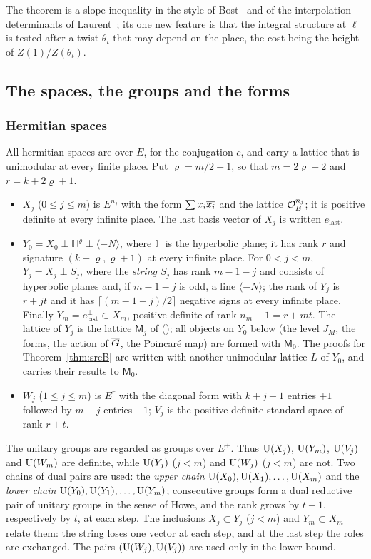 \documentclass[10pt]{amsart}
\theoremstyle{definition}
\theoremstyle{remark}
\begin{document}
The theorem is a slope inequality in the style of Bost~\cite{BostFoliations} and of the
interpolation determinants of Laurent~\cite{LaurentInterp}; its one new feature is that the
integral structure at $\ell$ is tested after a twist $\theta_\iota$ that may depend on the place,
the cost being the height of $Z(1)/Z(\theta_\iota)$.


\subsection{The spaces, the groups and the forms}\label{ss:au-spaces}

\subsubsection*{Hermitian spaces}
All hermitian spaces are over $E$, for the conjugation $c$, and carry a lattice that is unimodular
at every finite place. Put $\varrho=m/2-1$, so that $m=2\varrho+2$ and $r=k+2\varrho+1$.
\begin{itemize}
\item $X_j$ ($0\le j\le m$) is $E^{n_j}$ with the form $\sum x_i\overline{x_i}$ and the lattice
$\mathcal O_E^{n_j}$; it is positive definite at every infinite place. The last basis vector of $X_j$ is
written $e_{\mathrm{last}}$.
\item $Y_0=X_0\perp\mathbb H^{\varrho}\perp\langle-N\rangle$, where $\mathbb H$ is the hyperbolic
plane; it has rank $r$ and signature $(k+\varrho,\varrho+1)$ at every infinite place. For
$0<j<m$, $Y_j=X_j\perp S_j$, where the \emph{string} $S_j$ has rank $m-1-j$ and consists of
hyperbolic planes and, if $m-1-j$ is odd, a line $\langle-N\rangle$; the rank of $Y_j$ is
$r+jt$ and it has $\lceil(m-1-j)/2\rceil$ negative signs at every infinite place. Finally
$Y_m=e_{\mathrm{last}}^{\perp}\subset X_m$, positive definite of rank $n_m-1=r+mt$. The lattice of
$Y_j$ is the lattice $\mathsf M_j$ of {\cite[(35)]{P49}} ({\cite[\S5.1.3]{P49}}); all objects on $Y_0$
below (the level $J_M$, the forms, the action of $\overline G$, the Poincar\'e map) are formed with
$\mathsf M_0$. The proofs for Theorem~\ref{thm:srcB} are written with another unimodular lattice $L$ of
$Y_0$, and {\cite[Lemma~2.14]{P51}} carries their results to $\mathsf M_0$.
\item $W_j$ ($1\le j\le m$) is $E^r$ with the diagonal form with $k+j-1$ entries $+1$ followed by
$m-j$ entries $-1$; $V_j$ is the positive definite standard space of rank $r+t$.
\end{itemize}
The unitary groups are regarded as groups over $E^+$. Thus $\mathrm U(X_j)$, $\mathrm U(Y_m)$, $\mathrm U(V_j)$
and $\mathrm U(W_m)$ are definite, while $\mathrm U(Y_j)$ ($j<m$) and $\mathrm U(W_j)$ ($j<m$) are not. Two
chains of dual pairs are used: the \emph{upper chain} $\mathrm U(X_0),\mathrm U(X_1),\dots,\mathrm U(X_m)$ and
the \emph{lower chain} $\mathrm U(Y_0),\mathrm U(Y_1),\dots,\mathrm U(Y_m)$; consecutive groups form a dual
reductive pair of unitary groups in the sense of Howe, and the rank grows by $t+1$, respectively
by $t$, at each step. The inclusions $X_j\subset Y_j$ ($j<m$) and $Y_m\subset X_m$ relate them: the
string loses one vector at each step, and at the last step the roles are exchanged. The pairs
$(\mathrm U(W_j),\mathrm U(V_j))$ are used only in the lower bound.
\end{document}
